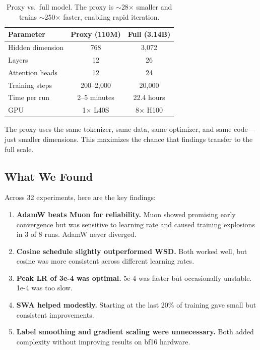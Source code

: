 \documentclass[11pt,a4paper]{article}
\begin{document}
\begin{table}[H]
\centering
\begin{tabular}{lcc}
\toprule
\textbf{Parameter} & \textbf{Proxy (110M)} & \textbf{Full (3.14B)} \\
\midrule
Hidden dimension & 768 & 3,072 \\
Layers & 12 & 26 \\
Attention heads & 12 & 24 \\
Training steps & 200--2,000 & 20,000 \\
Time per run & 2--5 minutes & 22.4 hours \\
GPU & 1$\times$ L40S & 8$\times$ H100 \\
\bottomrule
\end{tabular}
\caption{Proxy vs.\ full model. The proxy is $\sim$28$\times$ smaller and trains $\sim$250$\times$ faster, enabling rapid iteration.}
\label{tab:proxy_vs_full}
\end{table}

The proxy uses the same tokenizer, same data, same optimizer, and same code---just smaller dimensions. This maximizes the chance that findings transfer to the full scale.

\subsection{What We Found}

Across 32 experiments, here are the key findings:

\begin{enumerate}
    \item \textbf{AdamW beats Muon for reliability.} Muon showed promising early convergence but was sensitive to learning rate and caused training explosions in 3 of 8 runs. AdamW never diverged.
    \item \textbf{Cosine schedule slightly outperformed WSD.} Both worked well, but cosine was more consistent across different learning rates.
    \item \textbf{Peak LR of 3e-4 was optimal.} 5e-4 was faster but occasionally unstable. 1e-4 was too slow.
    \item \textbf{SWA helped modestly.} Starting at the last 20\% of training gave small but consistent improvements.
    \item \textbf{Label smoothing and gradient scaling were unnecessary.} Both added complexity without improving results on bf16 hardware.
\end{enumerate}
\end{document}
